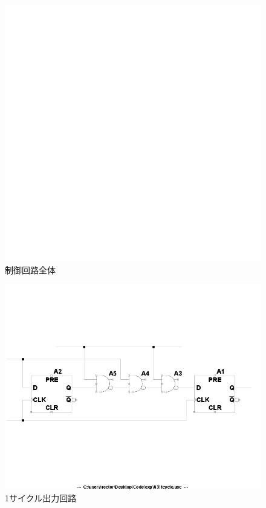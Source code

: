 \documentclass[10pt,a4j,dvipdfmx]{jsarticle}
\begin{document}
\begin{figure}[H]
       \centering
       \includegraphics[width=12cm]{token.png}
       \caption{制御回路全体}
\end{figure}

\begin{figure}[H]
       \centering
       \includegraphics[width=12cm]{1cycle.png}
       \caption{1サイクル出力回路}
\end{figure}
\end{document}
